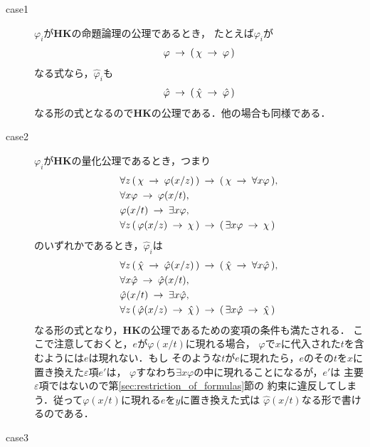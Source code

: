 	\begin{metaprf}\mbox{}
		\begin{description}
			\item[case1] $\varphi_{i}$が{\bf HK}の命題論理の公理であるとき，
				たとえば$\varphi_{i}$が
				\begin{align}
					\varphi \hspace{0.25em}\rightarrow\hspace{0.25em} (\, \chi \hspace{0.25em}\rightarrow\hspace{0.25em} \varphi\, )
				\end{align}
				なる式なら，$\hat{\varphi}_{i}$も
				\begin{align}
					\hat{\varphi} \hspace{0.25em}\rightarrow\hspace{0.25em} (\, \hat{\chi} \hspace{0.25em}\rightarrow\hspace{0.25em} \hat{\varphi}\, )
				\end{align}
				なる形の式となるので{\bf HK}の公理である．他の場合も同様である．
				
			\item[case2] $\varphi_{i}$が{\bf HK}の量化公理であるとき，つまり
				\begin{align}
					&\forall z\, (\, \chi \hspace{0.25em}\rightarrow\hspace{0.25em} \varphi(x/z)\, ) 
						\hspace{0.25em}\rightarrow\hspace{0.25em} (\, \chi \hspace{0.25em}\rightarrow\hspace{0.25em} \forall x \varphi\, ), \\
					&\forall x \varphi \hspace{0.25em}\rightarrow\hspace{0.25em} \varphi(x/t), \\
					&\varphi(x/t) \hspace{0.25em}\rightarrow\hspace{0.25em} \exists x \varphi, \\
					&\forall z\, (\, \varphi(x/z) \hspace{0.25em}\rightarrow\hspace{0.25em} \chi\, )
						\hspace{0.25em}\rightarrow\hspace{0.25em} (\, \exists x \varphi \hspace{0.25em}\rightarrow\hspace{0.25em} \chi\, )
				\end{align}
				のいずれかであるとき，$\hat{\varphi}_{i}$は
				\begin{align}
					&\forall z\, (\, \hat{\chi} \hspace{0.25em}\rightarrow\hspace{0.25em} \hat{\varphi}(x/z)\, ) 
						\hspace{0.25em}\rightarrow\hspace{0.25em} (\, \hat{\chi} \hspace{0.25em}\rightarrow\hspace{0.25em} \forall x \hat{\varphi}\, ), \\
					&\forall x \hat{\varphi} \hspace{0.25em}\rightarrow\hspace{0.25em} \hat{\varphi}(x/t), \\
					&\hat{\varphi}(x/t) \hspace{0.25em}\rightarrow\hspace{0.25em} \exists x \hat{\varphi}, \\
					&\forall z\, (\, \hat{\varphi}(x/z) \hspace{0.25em}\rightarrow\hspace{0.25em} \hat{\chi}\, )
						\hspace{0.25em}\rightarrow\hspace{0.25em} (\, \exists x \hat{\varphi} \hspace{0.25em}\rightarrow\hspace{0.25em} \hat{\chi}\, )
				\end{align}
				なる形の式となり，{\bf HK}の公理であるための変項の条件も満たされる．
				ここで注意しておくと，$e$が$\varphi(x/t)$に現れる場合，
				$\varphi$で$x$に代入された$t$を含むようには$e$は現れない．もし
				そのような$t$が$e$に現れたら，$e$のその$t$を$x$に置き換えた$\varepsilon$項$e'$は，
				$\varphi$すなわち$\exists x \varphi$の中に現れることになるが，$e'$は
				主要$\varepsilon$項ではないので第\ref{sec:restriction_of_formulas}節の
				約束に違反してしまう．従って$\varphi(x/t)$に現れる$e$を$y$に置き換えた式は
				$\hat{\varphi}(x/t)$なる形で書けるのである．
				
			\item[case3]
		\end{description}
	\end{metaprf}
	
